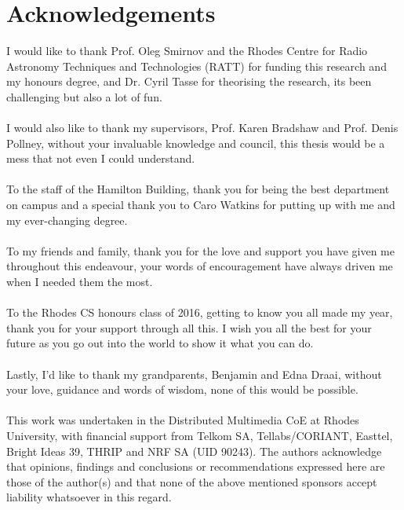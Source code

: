 \chapter*{Acknowledgements}
I would like to thank Prof. Oleg Smirnov and the Rhodes Centre for Radio Astronomy Techniques and Technologies (RATT) for funding this research and my honours degree, and Dr. Cyril Tasse for theorising the research, its been challenging but also a lot of fun.
\\
\\
I would also like to thank my supervisors, Prof. Karen Bradshaw and Prof. Denis Pollney, without your invaluable knowledge and council, this thesis would be a mess that not even I could understand.
\\
\\
To the staff of the Hamilton Building, thank you for being the best department on campus and a special thank you to Caro Watkins for putting up with me and my ever-changing degree.
\\
\\
To my friends and family, thank you for the love and support you have given me throughout this endeavour, your words of encouragement have always driven me when I needed them the most.
\\
\\
To the Rhodes CS honours class of 2016, getting to know you all made my year, thank you for your support through all this. I wish you all the best for your future as you go out into the world to show it what you can do.
\\
\\
Lastly, I'd like to thank my grandparents, Benjamin and Edna Draai, without your love, guidance and words of wisdom, none of this would be possible.
\\
\\
This work was undertaken in the Distributed Multimedia CoE at Rhodes University, with financial support from Telkom SA, Tellabs/CORIANT, Easttel, Bright Ideas 39, THRIP and NRF SA (UID 90243).  The authors acknowledge that opinions, findings and conclusions or recommendations expressed here are those of the author(s) and that none of the above mentioned sponsors accept liability whatsoever in this regard.